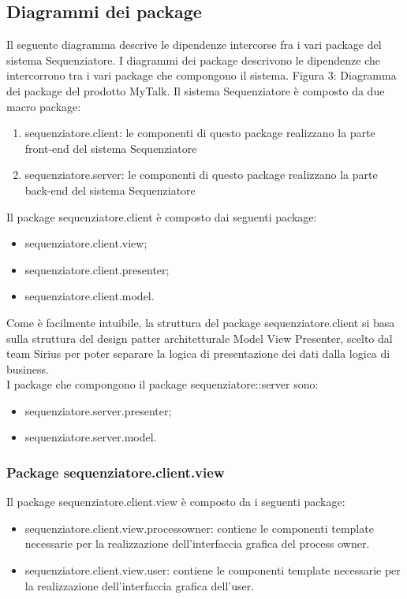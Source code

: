 \subsection{Diagrammi dei package}
Il seguente diagramma descrive le dipendenze intercorse fra i vari package del sistema Sequenziatore.
I diagrammi dei package descrivono le dipendenze che intercorrono tra i vari
package che compongono il sistema.
Figura 3: Diagramma dei package del prodotto MyTalk.
Il sistema Sequenziatore è composto da due macro package:
\begin{enumerate}
	\item sequenziatore.client: le componenti di questo package realizzano la parte front-end del sistema Sequenziatore 
	\item sequenziatore.server: le componenti di questo package realizzano la parte back-end del sistema Sequenziatore 
\end{enumerate}
Il package sequenziatore.client è composto dai seguenti package:
\begin{itemize}
	\item sequenziatore.client.view;
	\item sequenziatore.client.presenter;
	\item sequenziatore.client.model.
\end{itemize}
Come è facilmente intuibile, la struttura del package sequenziatore.client si basa sulla struttura del design patter
architetturale Model View Presenter, scelto dal team Sirius per poter separare la logica di presentazione dei dati dalla logica di business.\\
I package che compongono il package sequenziatore::server sono:
\begin{itemize}
	\item sequenziatore.server.presenter;
	\item sequenziatore.server.model.
\end{itemize}
\subsubsection{Package sequenziatore.client.view}
Il package sequenziatore.client.view è composto da i seguenti package:
\begin{itemize}
	\item sequenziatore.client.view.processowner: contiene le componenti template necessarie per la realizzazione dell’interfaccia grafica del process owner.
	\item sequenziatore.client.view.user: contiene le componenti template necessarie per la realizzazione dell’interfaccia grafica dell'user.
\end{itemize}
